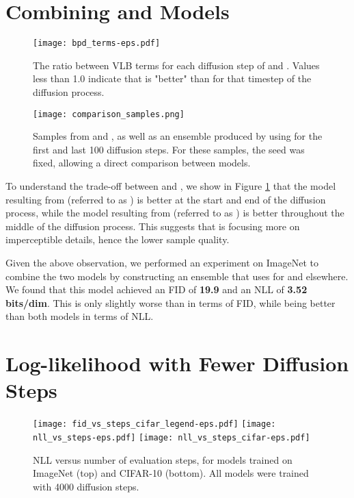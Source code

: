 \documentclass{article}
\begin{document}
\clearpage

\section{Combining  and  Models}

\begin{figure}[ht]
    \centerline{\texttt{[image: bpd\_terms-eps.pdf]}}
    \caption{\label{fig:bpdterms} The ratio between VLB terms for each diffusion step of  and . Values less than 1.0 indicate that  is "better" than  for that timestep of the diffusion process.}
\end{figure}

\begin{figure}[ht]
    \centering
    \texttt{[image: comparison\_samples.png]}
    \caption{\label{fig:objectivesamples} Samples from  and , as well as an ensemble produced by using  for the first and last 100 diffusion steps. For these samples, the seed was fixed, allowing a direct comparison between models.} 
\end{figure}

To understand the trade-off between  and , we show in Figure \ref{fig:bpdterms} that the model resulting from  (referred to as ) is better at the start and end of the diffusion process, while the model resulting from  (referred to as ) is better throughout the middle of the diffusion process. This suggests that  is focusing more on imperceptible details, hence the lower sample quality.

Given the above observation, we performed an experiment on ImageNet  to combine the two models by constructing an ensemble that uses  for  and  elsewhere. We found that this model achieved an FID of \textbf{19.9} and an NLL of \textbf{3.52 bits/dim}. This is only slightly worse than  in terms of FID, while being better than both models in terms of NLL.

\newpage
\section{Log-likelihood with Fewer Diffusion Steps}

\begin{figure}[ht]
    \centering
    \texttt{[image: fid\_vs\_steps\_cifar\_legend-eps.pdf]}
    \texttt{[image: nll\_vs\_steps-eps.pdf]}
    \texttt{[image: nll\_vs\_steps\_cifar-eps.pdf]}
    \caption{\label{fig:nllvssteps} NLL versus number of evaluation steps, for models trained on ImageNet  (top) and CIFAR-10 (bottom). All models were trained with 4000 diffusion steps.}
\end{figure}
\end{document}
